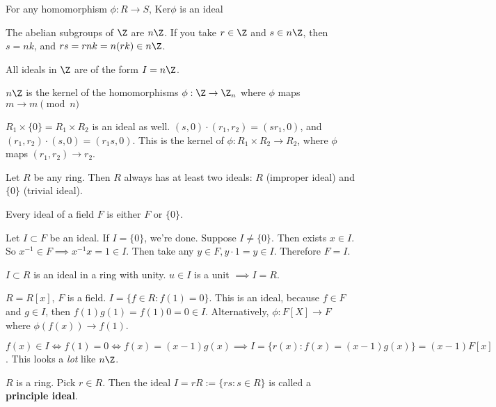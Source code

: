 \documentclass[10pt]{article}
\newcommand{\Ker}{\text{Ker}}
\begin{document}
\begin{cor}
    For any homomorphism $\phi: R\to S$, $\Ker\phi$ is an ideal
\end{cor}

\begin{exm*}
    The abelian subgroups of $\Z$ are $n\Z$. If you take $r \in \Z$ and $s \in n\Z$, then $s = nk$, and $rs = rnk = n(rk) \in n\Z$.
\end{exm*}

\begin{cor}
    All ideals in $\Z$ are of the form $I = n\Z$.
\end{cor}

$n\Z$ is the kernel of the homomorphisms $\phi: \Z \to \Z_n$ where $\phi$ maps $m \to m\pmod{n}$

\begin{exm*}
    $R_1 \times \{0\}= R_1 \times R_2$ is an ideal as well. $(s, 0)\cdot (r_1, r_2) = (sr_1, 0)$, and $(r_1, r_2)\cdot (s, 0) = (r_1s, 0)$. This is the kernel of $\phi: R_1 \times R_2 \to R_2$, where $\phi$ maps $(r_1, r_2) \to r_2$. 
\end{exm*}

Let $R$ be any ring. Then $R$ always has at least two ideals: $R$ (improper ideal) and $\{0\}$ (trivial ideal).

\begin{rmk}
    Every ideal of a field $F$ is either $F$ or $\{0\}$.
\end{rmk}
Let $I \subset F$ be an ideal. If $I = \{0\}$, we're done. Suppose $I \neq \{0\}$. Then exists $x\in I$. So $x^{-1} \in F \implies x^{-1}x = 1 \in I$. Then take any $y \in F, y \cdot 1 = y \in I$. Therefore $F = I$.

\begin{cor}
    $I \subset R$ is an ideal in a ring with unity. $u\in I$ is a unit $\implies I = R$.
\end{cor}

\begin{exm*}
    $R = R[x]$, $F$ is a field. $I = \{f \in R: f(1) = 0\}$. This is an ideal, because $f\in F$ and $g\in I$, then $f(1)g(1) = f(1)0 = 0 \in I$. Alternatively, $\phi: F[X] \to F$ where $\phi(f(x)) \to f(1)$.
\end{exm*}
$f(x) \in I \iff f(1) = 0 \iff f(x) = (x-1)g(x) \implies I = \{r(x) : f(x) = (x-1)g(x)\} = (x-1)F[x]$. This looks a \emph{lot} like $n\Z$. 

\begin{defn}
    $R$ is a ring. Pick $r \in R$. Then the ideal $I = rR := \{rs: s \in R\}$ is called a \textbf{principle ideal}.
\end{defn}
\end{document}

